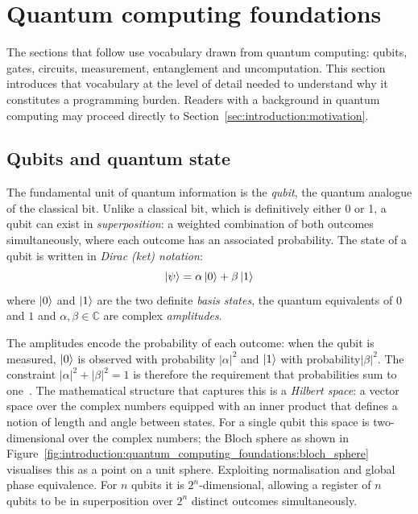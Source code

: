 \section{Quantum computing foundations}\label{sec:introduction:quantum_computing_foundations}
The sections that follow use vocabulary drawn from quantum computing: qubits, gates, circuits, measurement, entanglement and uncomputation.
This section introduces that vocabulary at the level of detail needed to understand why it constitutes a programming burden.
Readers with a background in quantum computing may proceed directly to Section~\ref{sec:introduction:motivation}.

\subsection{Qubits and quantum state}\label{subsec:introduction:quantum_computing_foundations:qubits_and_state}
The fundamental unit of quantum information is the \textit{qubit}, the quantum analogue of the classical bit.
Unlike a classical bit, which is definitively either 0 or 1, a qubit can exist in \textit{superposition}: a weighted combination of both outcomes simultaneously, where each outcome has an associated probability.
The state of a qubit is written in \textit{Dirac (ket) notation}:
\begin{equation}
    \ket{\psi} = \alpha\ket{0} + \beta\ket{1}
    \label{eq:introduction:quantum_computing_foundations:qubit_state}
\end{equation}
where $\ket{0}$ and $\ket{1}$ are the two definite \textit{basis states}, the quantum equivalents of $0$ and $1$ and $\alpha, \beta \in \mathbb{C}$ are complex \textit{amplitudes}.

The amplitudes encode the probability of each outcome: when the qubit is measured, $\ket{0}$ is observed with probability $|\alpha|^2$ and $\ket{1}$ with probability$|\beta|^2$.
The constraint $|\alpha|^2 + |\beta|^2 = 1$ is therefore the requirement that probabilities sum to one~\cite{nielsen2000quantum}.
The mathematical structure that captures this is a \textit{Hilbert space}: a vector space over the complex numbers equipped with an inner product that defines a notion of length and angle between states.
For a single qubit this space is two-dimensional over the complex numbers; the Bloch sphere as shown in Figure~\ref{fig:introduction:quantum_computing_foundations:bloch_sphere} visualises this as a point on a unit sphere.
Exploiting normalisation and global phase equivalence.
For $n$ qubits it is $2^n$-dimensional, allowing a register of $n$ qubits to be in superposition over $2^n$ distinct outcomes simultaneously.

